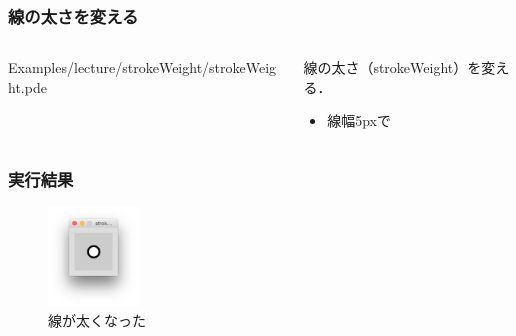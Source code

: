 \documentclass[10pt, dvipdfmx]{beamer}
\begin{document}
        \begin{frame}
            \frametitle{線の太さを変える}
            \begin{columns}[c]
                \begin{column}{0.50\textwidth}
                    \tiny
                    Examples/lecture/strokeWeight/strokeWeight.pde
                    \scriptsize
                \end{column}
                \begin{column}{0.50\textwidth}
                    \begin{block}{線の太さ（strokeWeight）を変える．}
                        \begin{itemize}
                            \item 線幅5pxで
                        \end{itemize}
                    \end{block}
                \end{column}
            \end{columns}
        \end{frame}

        \begin{frame}
            \frametitle{実行結果}
                \begin{figure}[htb]
                    \includegraphics[width=24mm]{images/08.png}
                    \caption{線が太くなった}
                    \label{fig:08}
                \end{figure}
        \end{frame}
\end{document}
